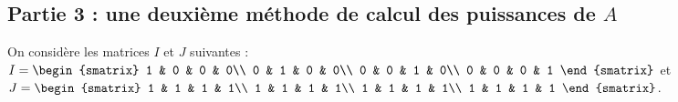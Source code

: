 \documentclass[11pt]{article}%
\begin{document}
\subsection*{Partie 3 : une deuxième méthode de calcul des puissances
  de $A$}

\noindent
On considère les matrices $I$ et $J$ suivantes : $I =
\begin{smatrix}
  1 & 0 & 0 & 0\\
  0 & 1 & 0 & 0\\
  0 & 0 & 1 & 0\\
  0 & 0 & 0 & 1
\end{smatrix}
$ et $J = 
\begin{smatrix}
  1 & 1 & 1 & 1\\
  1 & 1 & 1 & 1\\
  1 & 1 & 1 & 1\\
  1 & 1 & 1 & 1
\end{smatrix}
$.
\end{document}
